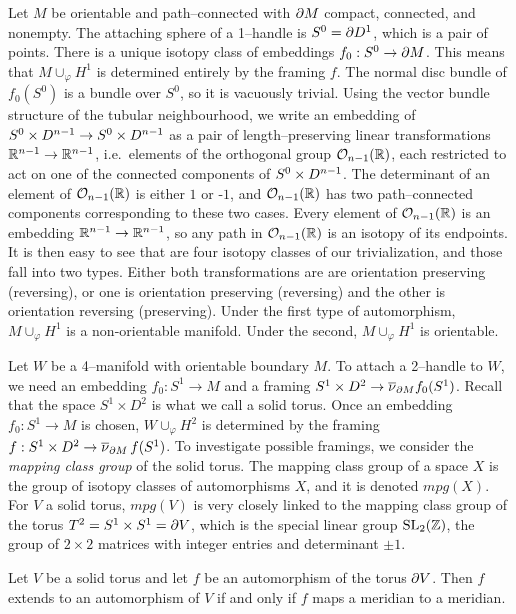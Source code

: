 \begin{rmk}
	\label{rmk:1handle}
	Let $M$ be orientable and path--connected with $\partial M$ compact, connected, and nonempty.
	The attaching sphere of a 1--handle is $S^0=\partial D^1$, which is a pair of points.
	There is a unique isotopy class of embeddings $f_0:S^0\to\partial M$.
	This means that $M\cup_\varphi H^1$ is determined entirely by the framing $f$.
	The normal disc bundle of $f_0(S^0)$ is a bundle over $S^0$, so it is vacuously trivial.
	Using the vector bundle structure of the tubular neighbourhood, we write an embedding of $S^0\times D^{n-1}\to S^0\times D^{n-1}$ as a pair of length--preserving linear transformations $\mathbb{R}^{n-1}\to\mathbb{R}^{n-1}$, i.e.\ elements of the orthogonal group $\mathcal{O}_{n-1}({\mathbb{R}})$, each restricted to act on one of the connected components of $S^0\times D^{n-1}$.
	The determinant of an element of $\mathcal{O}_{n-1}({\mathbb{R}})$ is either $1$ or -$1$, and $\mathcal{O}_{n-1}({\mathbb{R}})$ has two path--connected components corresponding to these two cases.
	Every element of $\mathcal{O}_{n-1}({\mathbb{R}})$ is an embedding $\mathbb{R}^{n-1}\to\mathbb{R}^{n-1}$, so any path in $\mathcal{O}_{n-1}({\mathbb{R}})$ is an isotopy of its endpoints.
	It is then easy to see that are four isotopy classes of our trivialization, and those fall into two types.
	Either both transformations are are orientation preserving (reversing), or one is orientation preserving (reversing) and the other is orientation reversing (preserving).
	Under the first type of automorphism, $M\cup_\varphi H^1$ is a non-orientable manifold.
	Under the second, $M\cup_\varphi H^1$ is orientable.
\end{rmk}

Let $W$ be a 4--manifold with orientable boundary $M$.
To attach a 2--handle to $W$, we need an embedding $f_0:S^1\to M$ and a framing $S^1\times D^2\to\overline{\nu}_{\partial M}f_0(S^1)$.
Recall that the space $S^1\times D^2$ is what we call a solid torus.
Once an embedding $f_0:S^1\to M$ is chosen, $W\cup_\varphi H^2$ is determined by the framing $f:S^1\times D^2\to \overline{\nu}_{\partial M}\,f(S^1)$.
To investigate possible framings, we consider the \emph{mapping class group} of the solid torus.
The mapping class group of a space $X$ is the group of isotopy classes of automorphisms $X$, and it is denoted $mpg(X)$.
For $V$ a solid torus, $mpg(V)$ is very closely linked to the mapping class group of the torus $T^2 = S^1\times S^1=\partial V$, which is the special linear group $\textrm{SL}_2(\mathbb{Z})$, the group of $2\times 2$ matrices with integer entries and determinant $\pm 1$.
\begin{lem}
	Let $V$ be a solid torus and let $f$ be an automorphism of the torus $\partial V$.
	Then $f$ extends to an automorphism of $V$ if and only if $f$ maps a meridian to a meridian.	
\end{lem}

